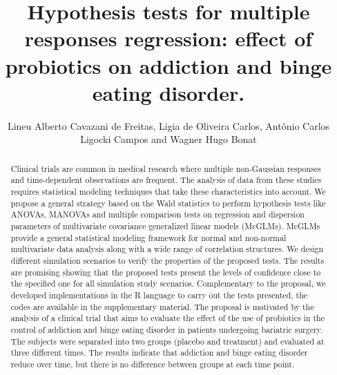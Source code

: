 \documentclass[Review,sagev,times, doublespace]{sagej}
\begin{document}

\title{Hypothesis tests for multiple responses regression: effect of probiotics on addiction and binge eating disorder.}

\author{Lineu Alberto Cavazani de Freitas, Ligia de Oliveira Carlos, Antônio Carlos Ligocki Campos and Wagner Hugo Bonat}




\begin{abstract}

Clinical trials are common in medical research where multiple non-Gaussian responses and time-dependent observations are frequent.
The analysis of data from these studies requires statistical modeling techniques that take these characteristics into account. 
We propose a general strategy based on the Wald statistics to perform hypothesis tests like ANOVAs, MANOVAs and multiple comparison tests on 
regression and dispersion parameters of multivariate covariance generalized linear models (McGLMs). 
McGLMs provide a general statistical modeling framework for normal and non-normal multivariate data analysis along with a wide range of correlation structures. 
We design different simulation scenarios to verify the properties of the proposed tests. 
The results are promising showing that the proposed tests present the levels of confidence close to the specified one for all simulation study scenarios.
Complementary to the proposal, we developed implementations in the R language to carry out the tests presented, the codes are available in the supplementary material.
The proposal is motivated by the analysis of a clinical trial that aims to evaluate the effect of the use of probiotics in the control of addiction and binge eating disorder in patients undergoing bariatric surgery. 
The subjects were separated into two groups (placebo and treatment) and evaluated at three different times. 
    The results indicate that addiction and binge eating disorder reduce over time, but there is no difference between groups at each time point.

\end{abstract}
\end{document}
